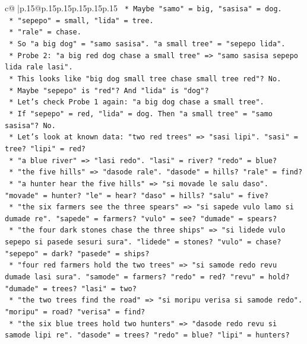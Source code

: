 \documentclass{article}
\begin{document}
{\begin{supertabular}{c@{$\;$}|p{.15\linewidth}@{}p{.15\linewidth}p{.15\linewidth}p{.15\linewidth}p{.15\linewidth}p{.15\linewidth}}
{{{\texttt{            *   Maybe "samo" = big, "sasisa" = dog.} \\
\texttt{            *   "sepepo" = small, "lida" = tree.} \\
\texttt{            *   "rale" = chase.} \\
\texttt{            *   So "a big dog" = "samo sasisa". "a small tree" = "sepepo lida".} \\
\texttt{        *   Probe 2: "a big red dog chase a small tree" => "samo sasisa sepepo lida rale lasi".} \\
\texttt{            *   This looks like "big dog small tree chase small tree red"? No.} \\
\texttt{            *   Maybe "sepepo" is "red"? And "lida" is "dog"?} \\
\texttt{            *   Let's check Probe 1 again: "a big dog chase a small tree".} \\
\texttt{                *   If "sepepo" = red, "lida" = dog. Then "a small tree" = "samo sasisa"? No.} \\
\texttt{                *   Let's look at known data: "two red trees" => "sasi lipi". "sasi" = tree? "lipi" = red?} \\
\texttt{                *   "a blue river" => "lasi redo". "lasi" = river? "redo" = blue?} \\
\texttt{                *   "the five hills" => "dasode rale". "dasode" = hills? "rale" = find?} \\
\texttt{                *   "a hunter hear the five hills" => "si movade le salu daso". "movade" = hunter? "le" = hear? "daso" = hills? "salu" = five?} \\
\texttt{                *   "the six farmers see the three spears" => "si sapede vulo lamo si dumade re". "sapede" = farmers? "vulo" = see? "dumade" = spears?} \\
\texttt{                *   "the four dark stones chase the three ships" => "si lidede vulo sepepo si pasede sesuri sura". "lidede" = stones? "vulo" = chase? "sepepo" = dark? "pasede" = ships?} \\
\texttt{                *   "four red farmers hold the two trees" => "si samode redo revu dumade lasi sura". "samode" = farmers? "redo" = red? "revu" = hold? "dumade" = trees? "lasi" = two?} \\
\texttt{                *   "the two trees find the road" => "si moripu verisa si samode redo". "moripu" = road? "verisa" = find?} \\
\texttt{                *   "the six blue trees hold two hunters" => "dasode redo revu si samode lipi re". "dasode" = trees? "redo" = blue? "lipi" = hunters?} \\
}}}
\end{supertabular}}
\end{document}
